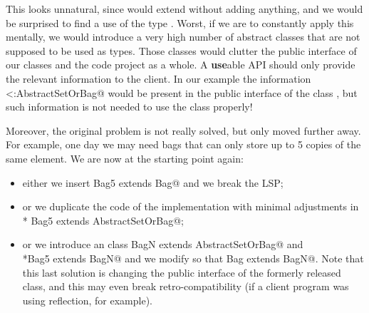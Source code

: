 This looks unnatural, since \Q@Set@ would extend \Q@AbstractSetOrBag@ without adding anything,
and we would be surprised to find a use of the type \Q@AbstractSetOrBag@.
Worst, if we are to constantly apply this mentally, we would introduce a very high number
of abstract classes that are not supposed to be used as types. Those classes would clutter the 
public interface of our classes and the code project as a whole.
A \textbf{use}able API should only provide the relevant information to the client.
In our example the information \Q@Set<:AbstractSetOrBag@ would be present in the public interface
of the class \Q@Set@, but such information is not needed to use the class properly!

Moreover, the original problem is not really solved, but only moved 
further away. For example, one day  we may need bags that can only store up to 5 copies of the same element.
We are now at the starting point again:
\begin{itemize}
\item either we insert \Q@class Bag5 extends Bag@ and we break the LSP; 
\item or we duplicate the code of the \Q@Bag@ implementation with minimal
  adjustments in \\* \Q@class Bag5 extends AbstractSetOrBag@;
\item or we introduce an
\Q@abstract class BagN extends AbstractSetOrBag@ and \\*\Q@class Bag5 extends BagN@
and we modify \Q@Bag@ so that  \Q@class Bag extends BagN@.
Note that this last solution is changing the public interface of the formerly released \Q@Bag@ class, and
this may even break retro-compatibility (if a client program was using
reflection, for example).
\end{itemize}

